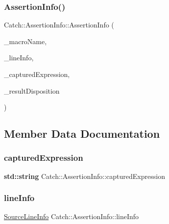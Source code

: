 \subsubsection{\texorpdfstring{Assertion\+Info()}{AssertionInfo()}\hspace{0.1cm}{\footnotesize\ttfamily [2/2]}}
{\footnotesize\ttfamily Catch\+::\+Assertion\+Info\+::\+Assertion\+Info (\begin{DoxyParamCaption}\item[{\textbf{ std\+::string} const \&}]{\+\_\+macro\+Name,  }\item[{\hyperlink{struct_catch_1_1_source_line_info}{Source\+Line\+Info} const \&}]{\+\_\+line\+Info,  }\item[{\textbf{ std\+::string} const \&}]{\+\_\+captured\+Expression,  }\item[{\hyperlink{struct_catch_1_1_result_disposition_a3396cad6e2259af326b3aae93e23e9d8}{Result\+Disposition\+::\+Flags}}]{\+\_\+result\+Disposition }\end{DoxyParamCaption})}



\subsection{Member Data Documentation}
\mbox{\label{struct_catch_1_1_assertion_info_af7c1d3cbfa346e9a303030fa0ef0cb54}} 
\subsubsection{\texorpdfstring{captured\+Expression}{capturedExpression}}
{\footnotesize\ttfamily \textbf{ std\+::string} Catch\+::\+Assertion\+Info\+::captured\+Expression}

\mbox{\label{struct_catch_1_1_assertion_info_a17bdbb404ba12658034f833be2f4c3e7}} 
\subsubsection{\texorpdfstring{line\+Info}{lineInfo}}
{\footnotesize\ttfamily \hyperlink{struct_catch_1_1_source_line_info}{Source\+Line\+Info} Catch\+::\+Assertion\+Info\+::line\+Info}

